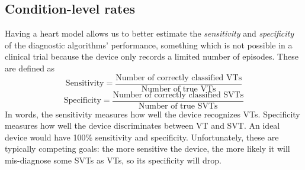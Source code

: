 %

\subsection{Condition-level rates}
\label{sec:condition-level}
Having a heart model allows us to better estimate the \emph{sensitivity} and \emph{specificity} of the diagnostic algorithms' performance, something which is not possible in a clinical trial because the device only records a limited number of episodes.
These are defined as
\[ \text{Sensitivity} = \frac{\text{Number of correctly classified VTs}}{\text{Number of true VTs}}\]
\[ \text{Specificity} = \frac{\text{Number of correctly classified SVTs}}{\text{Number of true SVTs}}\]
In words, the sensitivity measures how well the device recognizes VTs.
Specificity measures how well the device discriminates between VT and SVT.
An ideal device would have 100\% sensitivity and specificity.
Unfortunately, these are typically competing goals: the more sensitive the device, the more likely it will mis-diagnose some SVTs as VTs, so its specificity will drop.

